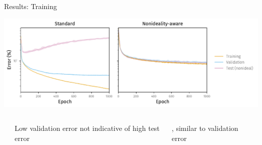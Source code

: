 \documentclass[
  aspectratio=169,
  hyperref={breaklinks=true, colorlinks, citecolor=blue, linkcolor=blue, urlcolor=blue},
]{beamer}
\begin{document}
\begin{frame}{Results: Training}
  \pause{}

  \includegraphics[width=\linewidth]{figures/PDF/iv-nonlinearity-training.pdf}

  \bigskip

  \begin{columns}
    \begin{column}{0.07\textwidth}
    \end{column}
    \begin{column}{0.37\textwidth}
      \pause{}

      Low validation error not indicative of \alert{high test error}
    \end{column}
    \begin{column}{0.37\textwidth}
      \pause{}

      , similar to validation error
    \end{column}
    \begin{column}{0.19\textwidth}
    \end{column}
  \end{columns}
\end{frame}
\end{document}
